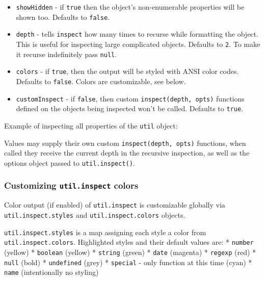 \begin{itemize}
\item
  \texttt{showHidden} - if \texttt{true} then the object's
  non-enumerable properties will be shown too. Defaults to
  \texttt{false}.
\item
  \texttt{depth} - tells \texttt{inspect} how many times to recurse
  while formatting the object. This is useful for inspecting large
  complicated objects. Defaults to \texttt{2}. To make it recurse
  indefinitely pass \texttt{null}.
\item
  \texttt{colors} - if \texttt{true}, then the output will be styled
  with ANSI color codes. Defaults to \texttt{false}. Colors are
  customizable, see below.
\item
  \texttt{customInspect} - if \texttt{false}, then custom
  \texttt{inspect(depth, opts)} functions defined on the objects being
  inspected won't be called. Defaults to \texttt{true}.
\end{itemize}

Example of inspecting all properties of the \texttt{util} object:

\begin{Shaded}
\begin{Highlighting}[]
 \NormalTok{);}

\NormalTok{(}\NormalTok{: }\NormalTok{, }
\end{Highlighting}
\end{Shaded}

Values may supply their own custom \texttt{inspect(depth, opts)}
functions, when called they receive the current depth in the recursive
inspection, as well as the options object passed to
\texttt{util.inspect()}.

\subsubsection{Customizing \texttt{util.inspect} colors}

Color output (if enabled) of \texttt{util.inspect} is customizable
globally via \texttt{util.inspect.styles} and
\texttt{util.inspect.colors} objects.

\texttt{util.inspect.styles} is a map assigning each style a color from
\texttt{util.inspect.colors}. Highlighted styles and their default
values are: * \texttt{number} (yellow) * \texttt{boolean} (yellow) *
\texttt{string} (green) * \texttt{date} (magenta) * \texttt{regexp}
(red) * \texttt{null} (bold) * \texttt{undefined} (grey) *
\texttt{special} - only function at this time (cyan) * \texttt{name}
(intentionally no styling)

